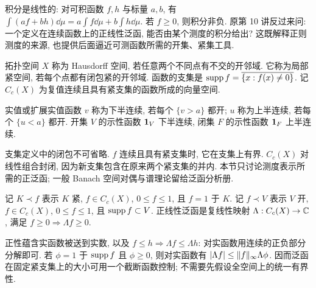 \label{ra:c4:chapter}


积分是线性的: 对可积函数 $f,h$ 与标量 $a,b$, 有 $\int(af+bh)\dd\mu=a\int f\dd\mu+b\int h\dd\mu$. 若 $f\ge0$, 则积分非负. 原第 10 讲反过来问: 一个定义在连续函数上的正线性泛函, 能否由某个测度的积分给出? 这既解释正则测度的来源, 也提供后面逼近可测函数所需的开集、紧集工具.

\begin{definition}\label{ra:c4:topology}
拓扑空间 $X$ 称为 Hausdorff 空间, 若任意两个不同点有不交的开邻域. 它称为局部紧空间, 若每个点都有闭包紧的开邻域. 函数的支集是 $\operatorname{supp} f=\overline{\{x:f(x)\ne0\}}$. 记 $C_c(X)$ 为复值连续且具有紧支集的函数所成的向量空间.

实值或扩展实值函数 $v$ 称为下半连续, 若每个 $\{v>a\}$ 都开; $u$ 称为上半连续, 若每个 $\{u<a\}$ 都开. 开集 $V$ 的示性函数 $\mathbf 1_V$ 下半连续, 闭集 $F$ 的示性函数 $\mathbf 1_F$ 上半连续.
\end{definition}

\begin{remark}
支集定义中的闭包不可省略. $f$ 连续且具有紧支集时, 它在支集上有界. $C_c(X)$ 对线性组合封闭, 因为新支集包含在原来两个紧支集的并内. 本节只讨论测度表示所需的正泛函; 一般 Banach 空间对偶与谱理论留给泛函分析册.
\end{remark}

\begin{definition}\label{ra:c4:cutoffnotation}
记 $K\prec f$ 表示 $K$ 紧, $f\in C_c(X)$, $0\le f\le1$, 且 $f=1$ 于 $K$. 记 $f\prec V$ 表示 $V$ 开, $f\in C_c(X)$, $0\le f\le1$, 且 $\operatorname{supp} f\subset V$. 正线性泛函是复线性映射 $\Lambda:C_c(X)\to\mathbb C$, 满足 $f\ge0\Rightarrow\Lambda f\ge0$.
\end{definition}

正性蕴含实函数被送到实数, 以及 $f\le h\Rightarrow\Lambda f\le\Lambda h$: 对实函数用连续的正负部分分解即可. 若 $\phi=1$ 于 $\operatorname{supp} f$ 且 $\phi\ge0$, 则对实函数有 $|\Lambda f|\le\lVert f\rVert_\infty\Lambda\phi$. 因而泛函在固定紧支集上的大小可用一个截断函数控制; 不需要先假设全空间上的统一有界性.

